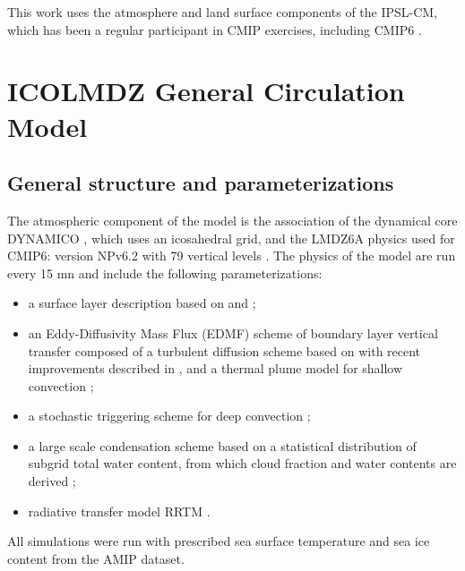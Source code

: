 This work uses the atmosphere and land surface components of the IPSL-CM, which has been a regular participant in CMIP exercises, including CMIP6 \citep{boucher_presentation_2020}. 

\section{ICOLMDZ General Circulation Model}
\subsection{General structure and parameterizations}
The atmospheric component of the model is the association of the dynamical core DYNAMICO \citep{dubos_dynamico-10_2015}, which uses an icosahedral grid, and the LMDZ6A physics used for CMIP6: version NPv6.2 with 79 vertical levels \citep{hourdin_lmdz6a_2020}. The physics of the model are run every 15 mn and include the following parameterizations:
\begin{itemize}
    \item a surface layer description based on \citet{louis_parametric_1979} and \citet{king_sensitivity_2001}; 
    \item an Eddy-Diffusivity Mass Flux (EDMF) scheme of boundary layer vertical transfer composed of a turbulent diffusion scheme based on \citet{yamada_simulations_1983} with recent improvements described in \citet{vignon_modeling_2018}, and a thermal plume model for shallow convection \citep{hourdin_unified_2019}; 
    \item a stochastic triggering scheme for deep convection \citep{rochetin_deep_2014, rochetin_deep_2014-1}; 
    \item a large scale condensation scheme based on a statistical distribution of subgrid total water content, from which cloud fraction and water contents are derived \citep{madeleine_improved_2020}; 
    \item radiative transfer model RRTM \citep{mlawer_radiative_1997}.
\end{itemize}

All simulations were run with prescribed sea surface temperature and sea ice content from the AMIP dataset.


